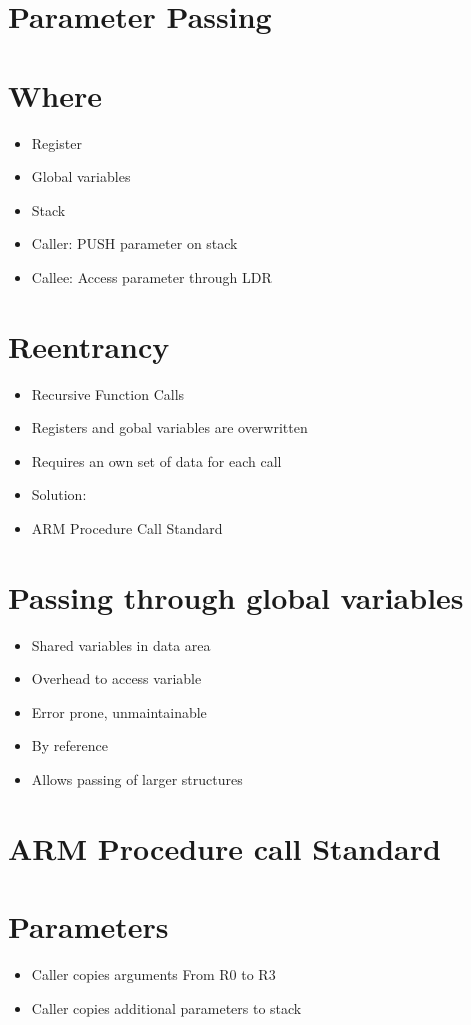 \section{Parameter Passing}

\section*{Where}
\begin{itemize}
  \item Register
  \item Global variables
  \item Stack
  \item Caller: PUSH parameter on stack
  \item Callee: Access parameter through LDR
\end{itemize}

\section*{Reentrancy}
\begin{itemize}
  \item Recursive Function Calls
  \item Registers and gobal variables are overwritten
  \item Requires an own set of data for each call
  \item Solution:
  \item ARM Procedure Call Standard
\end{itemize}

\section*{Passing through global variables}
\begin{itemize}
  \item Shared variables in data area
  \item Overhead to access variable
  \item Error prone, unmaintainable
  \item By reference
  \item Allows passing of larger structures
\end{itemize}

\section*{ARM Procedure call Standard}
\section*{Parameters}
\begin{itemize}
  \item Caller copies arguments From R0 to R3
  \item Caller copies additional parameters to stack
\end{itemize}

